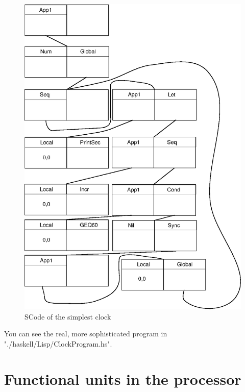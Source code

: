 \documentclass[a4paper, 11pt]{article}
\begin{document}
\begin{figure}[h]
\center
\caption{SCode of the simplest clock}
   \includegraphics[scale=0.5]{clock.eps}
\end{figure}

You can see the real, more sophisticated program in "./haskell/Lisp/ClockProgram.hs".

\newpage
\section{Functional units in the processor}
\end{document}
